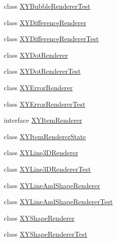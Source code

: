 \begin{DoxyCompactItemize}
\item 
class \mbox{\hyperlink{classorg_1_1jfree_1_1chart_1_1renderer_1_1xy_1_1_x_y_bubble_renderer_test}{X\+Y\+Bubble\+Renderer\+Test}}
\item 
class \mbox{\hyperlink{classorg_1_1jfree_1_1chart_1_1renderer_1_1xy_1_1_x_y_difference_renderer}{X\+Y\+Difference\+Renderer}}
\item 
class \mbox{\hyperlink{classorg_1_1jfree_1_1chart_1_1renderer_1_1xy_1_1_x_y_difference_renderer_test}{X\+Y\+Difference\+Renderer\+Test}}
\item 
class \mbox{\hyperlink{classorg_1_1jfree_1_1chart_1_1renderer_1_1xy_1_1_x_y_dot_renderer}{X\+Y\+Dot\+Renderer}}
\item 
class \mbox{\hyperlink{classorg_1_1jfree_1_1chart_1_1renderer_1_1xy_1_1_x_y_dot_renderer_test}{X\+Y\+Dot\+Renderer\+Test}}
\item 
class \mbox{\hyperlink{classorg_1_1jfree_1_1chart_1_1renderer_1_1xy_1_1_x_y_error_renderer}{X\+Y\+Error\+Renderer}}
\item 
class \mbox{\hyperlink{classorg_1_1jfree_1_1chart_1_1renderer_1_1xy_1_1_x_y_error_renderer_test}{X\+Y\+Error\+Renderer\+Test}}
\item 
interface \mbox{\hyperlink{interfaceorg_1_1jfree_1_1chart_1_1renderer_1_1xy_1_1_x_y_item_renderer}{X\+Y\+Item\+Renderer}}
\item 
class \mbox{\hyperlink{classorg_1_1jfree_1_1chart_1_1renderer_1_1xy_1_1_x_y_item_renderer_state}{X\+Y\+Item\+Renderer\+State}}
\item 
class \mbox{\hyperlink{classorg_1_1jfree_1_1chart_1_1renderer_1_1xy_1_1_x_y_line3_d_renderer}{X\+Y\+Line3\+D\+Renderer}}
\item 
class \mbox{\hyperlink{classorg_1_1jfree_1_1chart_1_1renderer_1_1xy_1_1_x_y_line3_d_renderer_test}{X\+Y\+Line3\+D\+Renderer\+Test}}
\item 
class \mbox{\hyperlink{classorg_1_1jfree_1_1chart_1_1renderer_1_1xy_1_1_x_y_line_and_shape_renderer}{X\+Y\+Line\+And\+Shape\+Renderer}}
\item 
class \mbox{\hyperlink{classorg_1_1jfree_1_1chart_1_1renderer_1_1xy_1_1_x_y_line_and_shape_renderer_test}{X\+Y\+Line\+And\+Shape\+Renderer\+Test}}
\item 
class \mbox{\hyperlink{classorg_1_1jfree_1_1chart_1_1renderer_1_1xy_1_1_x_y_shape_renderer}{X\+Y\+Shape\+Renderer}}
\item 
class \mbox{\hyperlink{classorg_1_1jfree_1_1chart_1_1renderer_1_1xy_1_1_x_y_shape_renderer_test}{X\+Y\+Shape\+Renderer\+Test}}

\end{DoxyCompactItemize}
